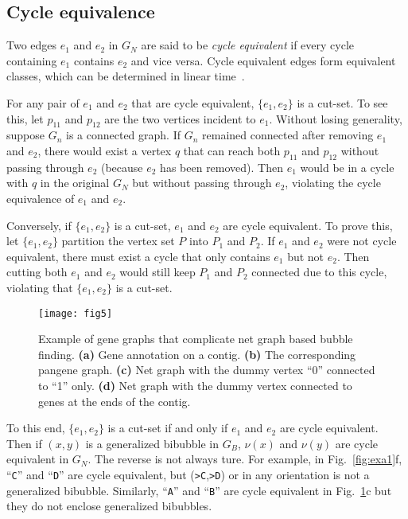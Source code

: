 \documentclass[webpdf,contemporary,large,namedate]{oup-authoring-template}%
\begin{document}
\subsection{Cycle equivalence}

Two edges $e_1$ and $e_2$ in $G_N$ are said to be \emph{cycle equivalent}
if every cycle containing $e_1$ contains $e_2$ and vice versa.
Cycle equivalent edges form equivalent classes, which can be determined in linear time~\citep{DBLP:conf/pldi/JohnsonPP94}.

For any pair of $e_1$ and $e_2$ that are cycle equivalent, $\{e_1,e_2\}$ is a cut-set.
To see this, let $p_{11}$ and $p_{12}$ are the two vertices incident to $e_1$.
Without losing generality, suppose $G_n$ is a connected graph.
If $G_n$ remained connected after removing $e_1$ and $e_2$,
there would exist a vertex $q$ that can reach both $p_{11}$ and $p_{12}$ without passing through $e_2$ (because $e_2$ has been removed).
Then $e_1$ would be in a cycle with $q$ in the original $G_N$ but without passing through $e_2$,
violating the cycle equivalence of $e_1$ and $e_2$.

Conversely, if $\{e_1,e_2\}$ is a cut-set, $e_1$ and $e_2$ are cycle equivalent.
To prove this, let $\{e_1,e_2\}$ partition the vertex set $P$ into $P_1$ and $P_2$.
If $e_1$ and $e_2$ were not cycle equivalent, there must exist a cycle that only contains $e_1$ but not $e_2$.
Then cutting both $e_1$ and $e_2$ would still keep $P_1$ and $P_2$ connected due to this cycle,
violating that $\{e_1,e_2\}$ is a cut-set.

\begin{figure}[t!]
\centering
\texttt{[image: fig5]}
\caption{Example of gene graphs that complicate net graph based bubble finding.
{\bf (a)} Gene annotation on a contig.
{\bf (b)} The corresponding pangene graph.
{\bf (c)} Net graph with the dummy vertex ``0'' connected to ``1'' only.
{\bf (d)} Net graph with the dummy vertex connected to genes at the ends of the contig.
}\label{fig:complex}
\end{figure}

To this end, $\{e_1,e_2\}$ is a cut-set if and only if $e_1$ and $e_2$ are cycle equivalent.
Then if $(x,y)$ is a generalized bibubble in $G_B$,
$\nu(x)$ and $\nu(y)$ are cycle equivalent in $G_N$.
The reverse is not always ture.
For example, in Fig.~\ref{fig:exa1}f, ``{\tt C}'' and ``{\tt D}'' are cycle equivalent,
but ({\tt >C},{\tt >D}) or in any orientation is not a generalized bibubble.
Similarly, ``{\tt A}'' and ``{\tt B}'' are cycle equivalent in Fig.~\ref{fig:complex}c but they do not enclose generalized bibubbles.
\end{document}
